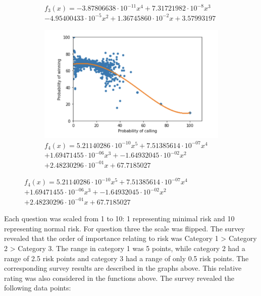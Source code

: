 \begin{figure}[ht]
\begin{subfigure}{0.5\textwidth}
    \caption{$f_3(x)=-3.87806638\cdot 10^{-11}x^4+7.31721982\cdot 10^{-8}x^3$ \\$ -4.95400433\cdot 10^{-5}x^2+ 1.36745860 \cdot 10^{-2}x+3.57993197$}
    \label{fig:12}
\end{subfigure}
\begin{subfigure}{0.5\textwidth}
    \centering
    \includegraphics[width=1\linewidth]{Bilder/calling_winning_graph}
    \caption{$f_4(x)=5.21140286\cdot 10^{-10}x^5+  7.51385614\cdot 10^{-07}x^4$ \\$+  1.69471455\cdot 10^{-06}x^3+ -1.64932045\cdot 10^{-02}x^2$\\$+2.48230296\cdot 10^{-01}x + 67.7185027$}
    \label{fig:13}
\end{subfigure}
\end{figure}
Each question was scaled from 1 to 10: 1 representing minimal risk and 10 representing normal risk. For question three the scale was flipped. The survey revealed that the order of importance relating to risk was Category 1 > Category 2 > Category 3. The range in category 1 was 5 points, while category 2 had a range of 2.5 risk points and category 3 had a range of only 0.5 risk points. The corresponding survey results are described in the graphs above. This relative rating was also considered in the functions above. The survey revealed the following data points: \\
